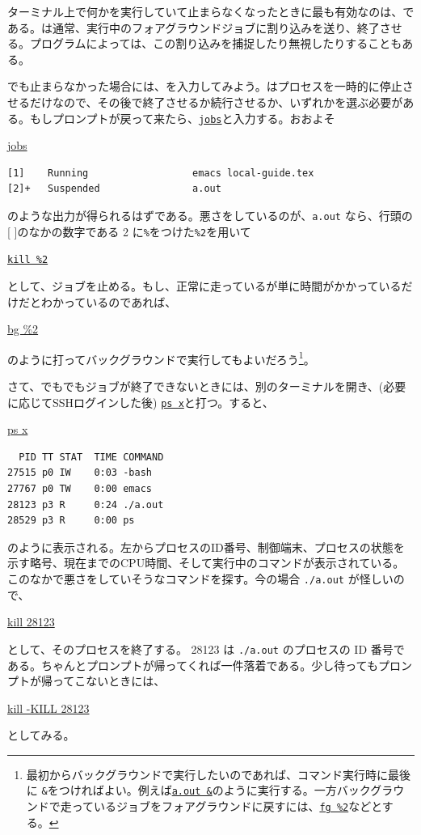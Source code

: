 ターミナル上で何かを実行していて止まらなくなったときに最も有効なのは、である。は通常、実行中のフォアグラウンドジョブに割り込みを送り、終了させる。プログラムによっては、この割り込みを捕捉したり無視したりすることもある。

でも止まらなかった場合には、を入力してみよう。はプロセスを一時的に停止させるだけなので、その後で終了させるか続行させるか、いずれかを選ぶ必要がある。もしプロンプトが戻って来たら、\underline{\texttt{jobs}}と入力する。おおよそ
\begin{commandline2}
    \prompt \underline{jobs}
    \vspace*{-.8em}
    \begin{verbatim}
[1]    Running                  emacs local-guide.tex
[2]+   Suspended                a.out
\end{verbatim}
\end{commandline2} \noindent
のような出力が得られるはずである。悪さをしているのが、\texttt{a.out} なら、行頭の[ ]のなかの数字である 2 に\texttt{\%}をつけた\texttt{\%2}を用いて
\begin{commandline2}
    \prompt \underline{\texttt{kill \%2}}
\end{commandline2} \noindent
として、ジョブを止める。もし、正常に走っているが単に時間がかかっているだけだとわかっているのであれば、
\begin{commandline2}
    \prompt \underline{bg \%2}
\end{commandline2} \noindent
のように打ってバックグラウンドで実行してもよいだろう\footnote{最初からバックグラウンドで実行したいのであれば、コマンド実行時に最後に \texttt{\&}をつければよい。例えば\underline{\texttt{a.out \&}}のように実行する。一方バックグラウンドで走っているジョブをフォアグラウンドに戻すには、\underline{\texttt{fg \%2}}などとする。}。

さて、でもでもジョブが終了できないときには、別のターミナルを開き、(必要に応じてSSHログインした後) \underline{\texttt{ps x}}と打つ。すると、
\begin{commandline2}
    \prompt \underline{ps x}
    \begin{verbatim}
  PID TT STAT  TIME COMMAND
27515 p0 IW    0:03 -bash
27767 p0 TW    0:00 emacs
28123 p3 R     0:24 ./a.out
28529 p3 R     0:00 ps
\end{verbatim}
\end{commandline2} \noindent
のように表示される。左からプロセスのID番号、制御端末、プロセスの状態を示す略号、現在までのCPU時間、そして実行中のコマンドが表示されている。このなかで悪さをしていそうなコマンドを探す。今の場合 \texttt{./a.out} が怪しいので、
\begin{commandline2}
    \prompt \underline{kill 28123}
\end{commandline2} \noindent
として、そのプロセスを終了する。 28123 は \texttt{./a.out} のプロセスの ID 番号である。ちゃんとプロンプトが帰ってくれば一件落着である。少し待ってもプロンプトが帰ってこないときには、
\begin{commandline2}
    \prompt \underline{kill -KILL 28123}
\end{commandline2} \noindent
としてみる。

